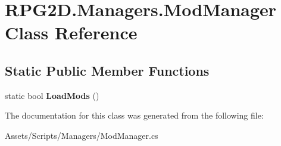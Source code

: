 \hypertarget{class_r_p_g2_d_1_1_managers_1_1_mod_manager}{}\section{R\+P\+G2\+D.\+Managers.\+Mod\+Manager Class Reference}
\label{class_r_p_g2_d_1_1_managers_1_1_mod_manager}
\subsection*{Static Public Member Functions}
\begin{DoxyCompactItemize}
\item 
\mbox{\label{class_r_p_g2_d_1_1_managers_1_1_mod_manager_a0535f9c56c324ebf6fefdfe7e0ac55ac}} 
static bool {\bfseries Load\+Mods} ()
\end{DoxyCompactItemize}


The documentation for this class was generated from the following file\+:\begin{DoxyCompactItemize}
\item 
Assets/\+Scripts/\+Managers/Mod\+Manager.\+cs\end{DoxyCompactItemize}
